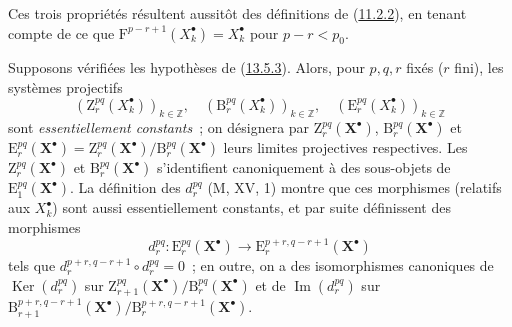 Ces trois propriétés résultent aussitôt des définitions de
(\hyperref[0.11.2.2-fr]{11.2.2}), en tenant compte de ce que
$\mathrm F^{p-r+1}(X_k^\bullet)=X_k^\bullet$ pour $p-r<p_0$.

\begin{env}[13.5.4]
\label{0.13.5.4-fr}
Supposons vérifiées les hypothèses de
(\hyperref[0.13.5.3-fr]{13.5.3}). Alors, pour $p,q,r$ fixés ($r$ fini), les
systèmes projectifs
\[
(\mathrm Z_r^{pq}(X_k^\bullet))_{k\in\mathbb Z},\quad
(\mathrm B_r^{pq}(X_k^\bullet))_{k\in\mathbb Z},\quad
(\mathrm E_r^{pq}(X_k^\bullet))_{k\in\mathbb Z}
\]
sont \emph{essentiellement constants}~; on désignera par
$\mathrm Z_r^{pq}(\mathbf X^\bullet)$,
$\mathrm B_r^{pq}(\mathbf X^\bullet)$ et
$\mathrm E_r^{pq}(\mathbf X^\bullet)=
\mathrm Z_r^{pq}(\mathbf X^\bullet)/
\mathrm B_r^{pq}(\mathbf X^\bullet)$ leurs limites projectives
respectives. Les $\mathrm Z_r^{pq}(\mathbf X^\bullet)$ et
$\mathrm B_r^{pq}(\mathbf X^\bullet)$ s'identifient canoniquement à des
sous-objets de $\mathrm E_1^{pq}(\mathbf X^\bullet)$. La définition des
$d_r^{pq}$ (M, XV, 1) montre que ces morphismes (relatifs aux
$X_k^\bullet$) sont aussi essentiellement constants, et par suite
définissent des morphismes
\begin{equation}
\label{0.13.5.4.1-fr}
\tag{13.5.4.1}
d_r^{pq}:\mathrm E_r^{pq}(\mathbf X^\bullet)
\longrightarrow\mathrm E_r^{p+r,q-r+1}(\mathbf X^\bullet)
\end{equation}
tels que $d_r^{p+r,q-r+1}\circ d_r^{pq}=0$~; en outre, on a des
isomorphismes canoniques de $\operatorname{Ker}(d_r^{pq})$ sur
$\mathrm Z_{r+1}^{pq}(\mathbf X^\bullet)/
\mathrm B_r^{pq}(\mathbf X^\bullet)$ et de
$\operatorname{Im}(d_r^{pq})$ sur
$\mathrm B_{r+1}^{p+r,q-r+1}(\mathbf X^\bullet)/
\mathrm B_r^{p+r,q-r+1}(\mathbf X^\bullet)$.
\end{env}

